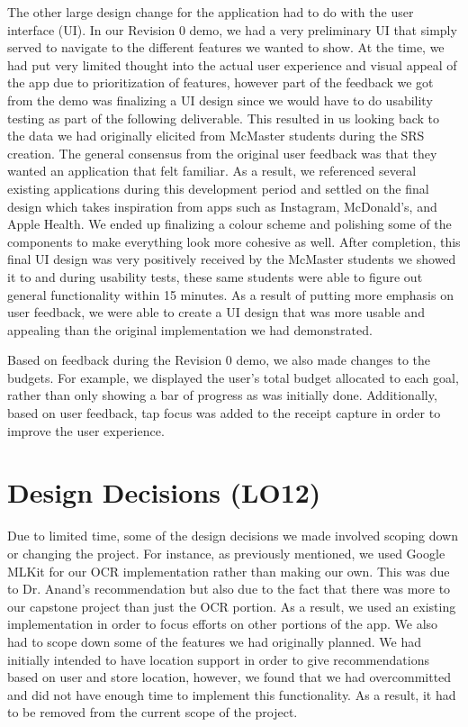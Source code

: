 \documentclass{article}
\begin{document}
The other large design change for the application had to do with the user interface (UI). In our Revision 0 demo,
we had a very preliminary UI that simply served to navigate to the different features we wanted to show. At the time,
we had put very limited thought into the actual user experience and visual appeal of the app due to prioritization of
features, however part of the feedback we got from the demo was finalizing a UI design since we would have to do
usability testing as part of the following deliverable. This resulted in us looking back to the data we had originally
elicited from McMaster students during the SRS creation. The general consensus from the original user feedback was that
they wanted an application that felt familiar. As a result, we referenced several existing applications during this development
period and settled on the final design which takes inspiration from apps such as Instagram, McDonald's, and Apple Health. We ended
up finalizing a colour scheme and polishing some of the components to make everything look more cohesive as well. After
completion, this final UI design was very positively received by the McMaster students we showed it to and during usability tests, 
these same students were able to figure out general functionality within 15 minutes. As a result of putting more emphasis on
user feedback, we were able to create a UI design that was more usable and appealing than the original implementation we had
demonstrated.

Based on feedback during the Revision 0 demo, we also made changes to the budgets. For example, we  displayed the user's
total budget allocated to each goal, rather than only showing a bar of progress as was initially done. Additionally, based
on user feedback, tap focus was added to the receipt capture in order to improve the user experience.

\section{Design Decisions (LO12)}


Due to limited time, some of the design decisions we made involved scoping down or changing
the project. For instance, as previously mentioned, we used Google MLKit for our OCR implementation
rather than making our own. This was due to Dr. Anand's recommendation but also due to the fact that
there was more to our capstone project than just the OCR portion. As a result, we used an existing implementation
in order to focus efforts on other portions of the app. We also had to scope down some of the features we
had originally planned. We had initially intended to have location support in order to give recommendations
based on user and store location, however, we found that we had overcommitted and did not have enough time to
implement this functionality. As a result, it had to be removed from the current scope of the project.
\end{document}
